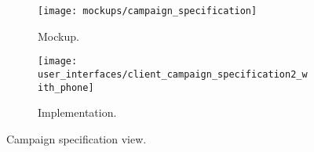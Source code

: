\begin{figure}
\begin{subfigure}[!t]{.48\textwidth}
  \centering
  \texttt{[image: mockups/campaign\_specification]}
  \caption{Mockup.}
  \label{fig:mockup_campaign_specification}
\end{subfigure}%
\begin{subfigure}[!t]{.52\textwidth}
  \centering
  \texttt{[image: user\_interfaces/client\_campaign\_specification2\_with\_phone]}
  \caption{Implementation.}
  \label{fig:implementation_campaign_specification}
\end{subfigure}
\caption{Campaign specification view.}
\label{fig:campaign_specification}
\end{figure}
\FloatBarrier
